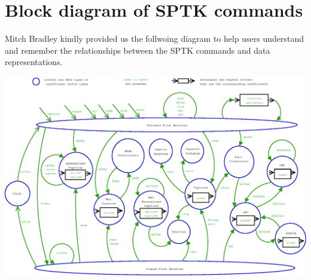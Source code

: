 \chapter*{Block diagram of SPTK commands}%

Mitch Bradley kindly provided us the follwoing diagram to help users understand
and remember the relationships between the SPTK commands and data representations.

\vspace{1.0cm} 

\includegraphics[width=16.5cm]{fig/sptk_sigproc.eps} 
